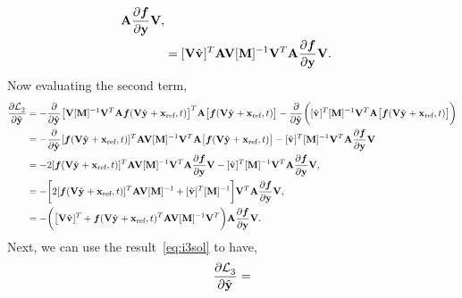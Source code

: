 \documentclass[3p,computermodern,10pt]{elsarticle}
\begin{document}
\begin{appendices}
\begin{align*}
\stweightingMatArg{n} \frac{\partial \velocity}{\partial \stateyDiscrete} \basisspace , \\
&= 
[\basisspace \genstateyDiscreteDotArgnt{} ]^T   \stweightingMatArg{n}   \basisspace  [\massArgnt{n}]^{-1}\basisspace^T
\stweightingMatArg{n} \frac{\partial \velocity}{\partial \stateyDiscrete} \basisspace .
\end{align*}
Now evaluating the second term,
\begin{align*}
\frac{\partial  \objectiveControlArg{}_2 }{\partial \genstateyDiscreteArgnt{}{}} &= 
-\frac{\partial  }{\partial \genstateyDiscreteArgnt{}{}}   \big[ \basisspace  [\massArgnt{n}]^{-1}\basisspace^T
\stweightingMatArg{n}  \velocity(\veloargsromy) \big]^T \stweightingMatArg{n} \big[ \velocity(\veloargsromy) \big]  - \frac{\partial  }{\partial \genstateyDiscreteArgnt{}{}} \bigg( [\controllerDiscreteDumArgnt{}]^T[\massArgnt{n}]^{-1} \basisspace^T \stweightingMatArg{n} \big[ \velocity(\veloargsromy) \big]  \bigg)  \\&= 
-\frac{\partial  }{\partial \genstateyDiscreteArgnt{}{}}    [\velocity(\veloargsromy)]^T \stweightingMatArg{n} \basisspace [\massArgnt{n}]^{-1} \basisspace^T 
 \stweightingMatArg{n} \big[ \velocity(\veloargsromy) \big]  - 
  [\controllerDiscreteDumArgnt{}]^T[\massArgnt{n}]^{-1} \basisspace^T \stweightingMatArg{n} \frac{\partial \velocity}{\partial \stateyDiscrete} \basisspace 
\\
&= 
- 2[\velocity(\veloargsromy)]^T \stweightingMatArg{n} \basisspace [\massArgnt{n}]^{-1} \basisspace^T \stweightingMatArg{n}  
 \frac{\partial \velocity}{\partial \stateyDiscrete} \basisspace - 
 [\controllerDiscreteDumArgnt{}]^T[\massArgnt{n}]^{-1} \basisspace^T \stweightingMatArg{n} \frac{\partial \velocity}{\partial \stateyDiscrete} \basisspace, \\
&= - \bigg[ 2[\velocity(\veloargsromy)]^T  \stweightingMatArg{n} \basisspace [\massArgnt{n}]^{-1}  + [\controllerDiscreteDumArgnt{}]^T  [\massArgnt{n}]^{-1} \bigg] \basisspace^T \stweightingMatArg{n} \frac{\partial \velocity}{\partial \stateyDiscrete} \basisspace ,\\
&= -\bigg( \big[ \basisspace \genstateyDiscreteDotArgnt{} ]^T  + \velocity(\veloargsromy)^T  \stweightingMatArg{n} \basisspace [\massArgnt{n}]^{-1} \basisspace^T \bigg) \stweightingMatArg{n} \frac{\partial \velocity}{\partial \stateyDiscrete} \basisspace. 
\end{align*}
Next, we can use the result~\eqref{eq:i3sol} to have,
$$ \frac{\partial  \objectiveControlArg{}_3 }{\partial \genstateyDiscreteArgnt{}{}} =
$$
\end{appendices}
\end{document}
